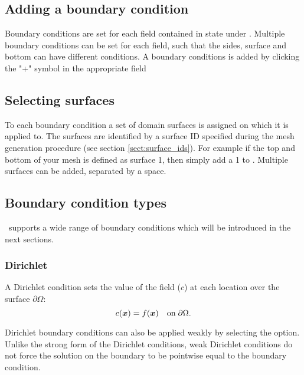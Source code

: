 \subsection{Adding a boundary condition}\label{Sect:BCs:adding}

Boundary conditions are set for each field contained in state under . 
Multiple boundary conditions can be set for each field, such that the sides, surface and bottom can 
have different conditions. A boundary conditions is added by clicking the "+" symbol
in the appropriate field

\subsection{Selecting surfaces}\label{Sect:BCs:selecting}
To each boundary condition a set of domain surfaces is assigned on which it is applied to. The surfaces are identified by a surface ID specified during the mesh generation procedure (see section \ref{sect:surface_ids}). For example if the top and bottom of your mesh is defined as surface
1, then simply add a 1 to . Multiple surfaces 
can be added, separated by a space.

\subsection{Boundary condition types}\label{Sect:BCs:types}
\fluidity\ supports a wide range of boundary conditions which will be introduced in the next sections.

\subsubsection{Dirichlet}

A Dirichlet condition sets the value of the field ($c$) at each location over the surface $\partial\Omega$:
\begin{equation*}
c({\mbox{\boldmath$x$}}) = f({\mbox{\boldmath$x$}}) \quad \textrm{on}\; \partial\Omega.
\end{equation*}

Dirichlet boundary conditions can also be applied weakly by selecting the 
option. Unlike the strong form of the Dirichlet conditions, weak Dirichlet
conditions do not force the solution on the boundary to be pointwise equal
to the boundary condition. 

